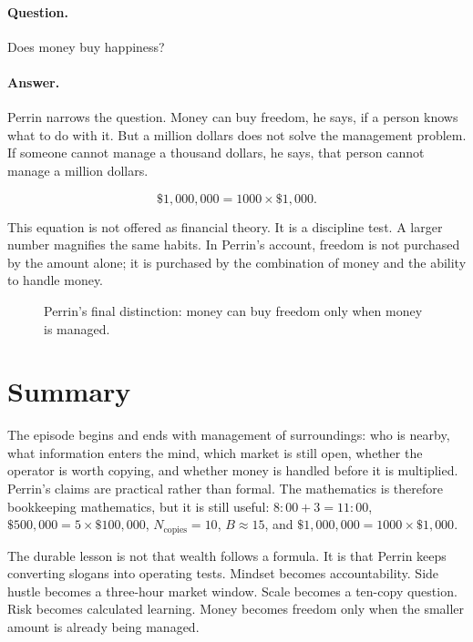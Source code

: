 \paragraph{Question.}
Does money buy happiness?

\paragraph{Answer.}
Perrin narrows the question. Money can buy freedom, he says, if a person knows what to do with it. But a million dollars does not solve the management problem. If someone cannot manage a thousand dollars, he says, that person cannot manage a million dollars.

\begin{equation}
\$1{,}000{,}000 = 1000 \times \$1{,}000.
\end{equation}

This equation is not offered as financial theory. It is a discipline test. A larger number magnifies the same habits. In Perrin's account, freedom is not purchased by the amount alone; it is purchased by the combination of money and the ability to handle money.

\begin{figure}
\centering
{}
\caption{Perrin's final distinction: money can buy freedom only when money is managed.}
\end{figure}

\section{Summary}

The episode begins and ends with management of surroundings: who is nearby, what information enters the mind, which market is still open, whether the operator is worth copying, and whether money is handled before it is multiplied. Perrin's claims are practical rather than formal. The mathematics is therefore bookkeeping mathematics, but it is still useful: \(8{:}00+3=11{:}00\), \(\$500{,}000=5\times\$100{,}000\), \(N_{\mathrm{copies}}=10\), \(B\approx15\), and \(\$1{,}000{,}000=1000\times\$1{,}000\).

The durable lesson is not that wealth follows a formula. It is that Perrin keeps converting slogans into operating tests. Mindset becomes accountability. Side hustle becomes a three-hour market window. Scale becomes a ten-copy question. Risk becomes calculated learning. Money becomes freedom only when the smaller amount is already being managed.